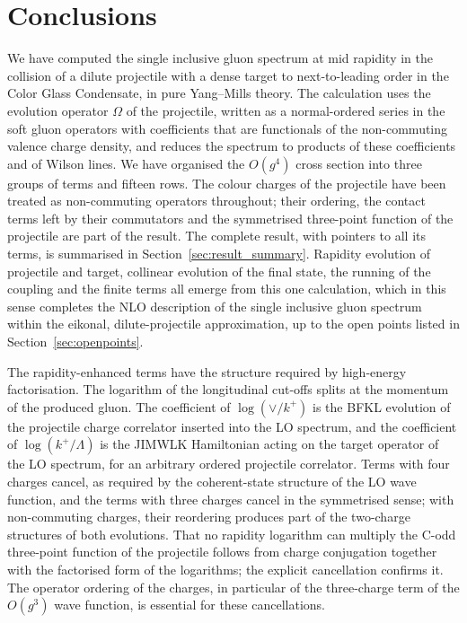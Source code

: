 \section{Conclusions}\label{sec:conclusions}


We have computed the single inclusive gluon spectrum at mid rapidity in the collision of a dilute projectile with a dense target to next-to-leading order in the Color Glass Condensate, in pure Yang--Mills theory. The calculation uses the evolution operator $\Omega$ of the projectile, written as a normal-ordered series in the soft gluon operators with coefficients that are functionals of the non-commuting valence charge density, and reduces the spectrum to products of these coefficients and of Wilson lines. We have organised the $O(g^4)$ cross section into three groups of terms and fifteen rows. The colour charges of the projectile have been treated as non-commuting operators throughout; their ordering, the contact terms left by their commutators and the symmetrised three-point function of the projectile are part of the result. The complete result, with pointers to all its terms, is summarised in Section~\ref{sec:result_summary}. Rapidity evolution of projectile and target, collinear evolution of the final state, the running of the coupling and the finite terms all emerge from this one calculation, which in this sense completes the NLO description of the single inclusive gluon spectrum within the eikonal, dilute-projectile approximation, up to the open points listed in Section~\ref{sec:openpoints}.

The rapidity-enhanced terms have the structure required by high-energy factorisation. The logarithm of the longitudinal cut-offs splits at the momentum of the produced gluon. The coefficient of $\log(\vee/k^+)$ is the BFKL evolution of the projectile charge correlator inserted into the LO spectrum, and the coefficient of $\log(k^+/\Lambda)$ is the JIMWLK Hamiltonian acting on the target operator of the LO spectrum, for an arbitrary ordered projectile correlator. Terms with four charges cancel, as required by the coherent-state structure of the LO wave function, and the terms with three charges cancel in the symmetrised sense; with non-commuting charges, their reordering produces part of the two-charge structures of both evolutions. That no rapidity logarithm can multiply the C-odd three-point function of the projectile follows from charge conjugation together with the factorised form of the logarithms; the explicit cancellation confirms it. The operator ordering of the charges, in particular of the three-charge term of the $O(g^3)$ wave function, is essential for these cancellations.


